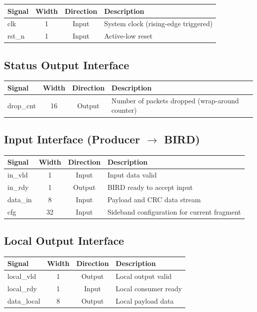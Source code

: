 \documentclass[11pt,a4paper]{article}
\begin{document}
\begin{longtable}{|>{\ttfamily}p{3cm}|c|c|p{7cm}|}
\hline
Signal & Width & Direction & Description \\
\hline
clk & 1 & Input & System clock (rising-edge triggered) \\
rst\_n & 1 & Input & Active-low reset \\
\hline
\end{longtable}

\subsection{Status Output Interface}

\begin{longtable}{|>{\ttfamily}p{3cm}|c|c|p{7cm}|}
\hline
Signal & Width & Direction & Description \\
\hline
drop\_cnt & 16 & Output & Number of packets dropped (wrap-around counter) \\
\hline
\end{longtable}

\subsection{Input Interface (Producer $\rightarrow$ BIRD)}

\begin{longtable}{|>{\ttfamily}p{3cm}|c|c|p{7cm}|}
\hline
Signal & Width & Direction & Description \\
\hline
in\_vld & 1 & Input & Input data valid \\
in\_rdy & 1 & Output & BIRD ready to accept input \\
data\_in & 8 & Input & Payload and CRC data stream \\
cfg & 32 & Input & Sideband configuration for current fragment \\
\hline
\end{longtable}

\subsection{Local Output Interface}

\begin{longtable}{|>{\ttfamily}p{3cm}|c|c|p{7cm}|}
\hline
Signal & Width & Direction & Description \\
\hline
local\_vld & 1 & Output & Local output valid \\
local\_rdy & 1 & Input & Local consumer ready \\
data\_local & 8 & Output & Local payload data \\
\hline
\end{longtable}
\end{document}
